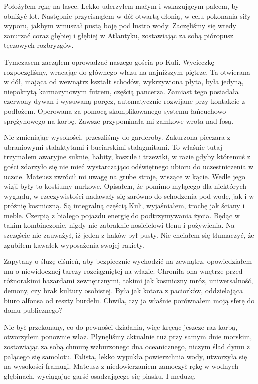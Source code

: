 Położyłem rękę na lasce. Lekko uderzyłem małym i wskazującym palcem, by obniżyć lot.
Następnie przycisnąłem w dół otwartą dłonią, w celu pokonania siły wyporu, jakbym wmuszał pustą boję pod lustro wody.
Zaczęliśmy się wtedy zanurzać coraz głębiej i głębiej w Atlantyku, zostawiając za sobą pióropusz tęczowych rozbryzgów.

Tymczasem zacząłem oprowadzać naszego gościa po Kuli.
Wycieczkę rozpoczęliśmy, wracając do głównego włazu na najniższym piętrze.
Ta otwierana w dół, mająca od wewnątrz kształt schodów, wykrzywiona płyta, była jedyną, niepokrytą karmazynowym futrem, częścią pancerza.
Zamiast tego posiadała czerwony dywan i wysuwaną poręcz, automatycznie rozwijane przy kontakcie z podłożem.
Operowana za pomocą skomplikowanego systemu łańcuchowo-sprężynowego na korbę. Zawsze przypominała mi zamkowe wrota nad fosą.

Nie zmieniając wysokości, przeszliśmy do garderoby. Zakurzona pieczara z ubraniowymi stalaktytami i buciarskimi stalagmitami.
To właśnie tutaj trzymałem awaryjne suknie, habity, koszule i trzewiki, w razie gdyby któremuś z gości zdarzyło się nie mieć wystarczająco odświętnego ubioru do uczestniczenia w uczcie.
Mateusz zwrócił mi uwagę na grube stroje, wiszące w kącie. Wedle jego wizji były to kostiumy nurkowe.
Opisałem, że pomimo mylącego dla niektórych wyglądu, w rzeczywistości nadawały się zarówno do schodzenia pod wodę, jak i w próżnię kosmiczną.
Są integralną częścią Kuli, wyjaśniałem, trochę jak ściany i meble. 
Czerpią z białego pojazdu energię do podtrzymywania życia. 
Będąc w takim kombinezonie, nigdy nie zabraknie nosicielowi tlenu i pożywienia.
Na szczęście nie zauważył, iż jeden z haków był pusty. 
Nie chciałem się tłumaczyć, że zgubiłem kawałek wyposażenia swojej rakiety.

Zapytany o śluzę ciśnień, aby bezpiecznie wychodzić na zewnątrz, opowiedziałem mu o niewidocznej tarczy rozciągniętej na włazie. 
Chroniła ona wnętrze przed różnorakimi hazardami zewnętrznymi, takimi jak kosmiczny mróz, uniwersalność, demony, czy brak kultury osobistej.
Była jak kotara z paciorków, oddzielająca biuro alfonsa od reszty burdelu.
Chwila, czy ja właśnie porównałem moją sferę do domu publicznego?

Nie był przekonany, co do pewności działania, więc kręcąc jeszcze raz korbą, otworzyłem ponownie właz. 
Płynęliśmy aktualnie tuż przy samym dnie morskim, zostawiając za sobą chmurę wzburzonego dna oceanicznego, niczym ślad dymu z palącego się samolotu.
Falista, lekko wypukła powierzchnia wody, utworzyła się na wysokości framugi. 
Mateusz z niedowierzaniem zamoczył rękę w wodnych głębinach, wyciągając garść osadzającego się piasku.
I meduzę.


